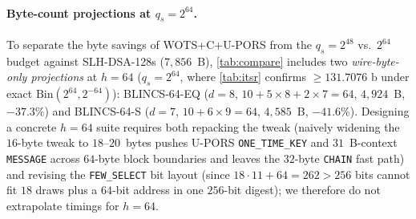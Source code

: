 \documentclass[11pt,a4paper]{article}
\theoremstyle{definition}
\theoremstyle{remark}
\newcommand{\BLINCSsixfour}{\textsf{BLINCS-64-EQ}}
\newcommand{\BLINCSsixfours}{\textsf{BLINCS-64-S}}
\newcommand{\WOTSC}{\textsf{WOTS+C}}
\newcommand{\UPORS}{\textsf{U-PORS}}
\begin{document}
\paragraph{Byte-count projections at $q_s = 2^{64}$.}
To separate the byte savings of \WOTSC{}+\UPORS{} from the $q_s = 2^{48}$ vs.\ $2^{64}$ budget against \textsf{SLH-DSA-128s} ($7{,}856$~B), \cref{tab:compare} includes two \emph{wire-byte-only projections} at $h = 64$ ($q_s = 2^{64}$, where \cref{tab:itsr} confirms $\ge 131.7076\text{ b}$ under exact $\mathrm{Bin}(2^{64}, 2^{-64})$): \BLINCSsixfour{} ($d = 8$, $10{+}5{\times}8{+}2{\times}7 = 64$, $4{,}924$~B, $-37.3\%$) and \BLINCSsixfours{} ($d = 7$, $10{+}6{\times}9 = 64$, $4{,}585$~B, $-41.6\%$). Designing a concrete $h = 64$ suite requires both repacking the tweak (naively widening the $16$-byte tweak to $18$--$20$~bytes pushes \UPORS{} \texttt{ONE\_TIME\_KEY} and $31$~B-context \texttt{MESSAGE} across $64$-byte block boundaries and leaves the $32$-byte \texttt{CHAIN} fast path) and revising the \texttt{FEW\_SELECT} bit layout (since $18 \cdot 11 + 64 = 262 > 256$ bits cannot fit $18$ draws plus a $64$-bit address in one $256$-bit digest); we therefore do not extrapolate timings for $h = 64$.
\end{document}

